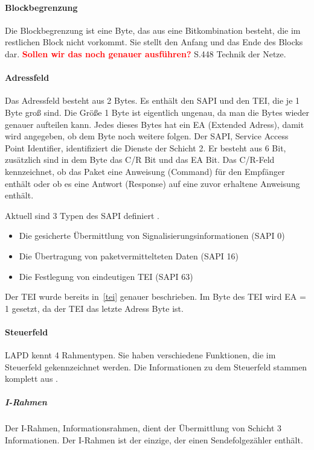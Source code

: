 \documentclass[12pt, a4paper, ngerman]{article}
\begin{document}
\paragraph{Blockbegrenzung \label{blockbegrenzung}}
Die Blockbegrenzung ist eine Byte, das aus eine Bitkombination besteht, die im restlichen Block nicht vorkommt. Sie stellt den Anfang und das Ende des Blocks dar. \textcolor{red}{\textbf{Sollen wir das noch genauer ausführen?}}  S.448 Technik der Netze.  

\paragraph{Adressfeld}
Das Adressfeld besteht aus 2 Bytes. Es enthält den SAPI und den TEI, die je 1 Byte groß sind. Die Größe 1 Byte ist eigentlich ungenau, da man die Bytes wieder genauer aufteilen kann. Jedes dieses Bytes hat ein EA (Extended Adress), damit wird angegeben, ob dem Byte noch weitere folgen. Der SAPI, Service Access Point Identifier,  identifiziert die Dienste der Schicht 2. Er besteht aus 6 Bit, zusätzlich sind in dem Byte das C/R Bit und das EA Bit. Das C/R-Feld kennzeichnet, ob das Paket eine Anweisung (Command) für den Empfänger enthält oder ob es eine Antwort (Response) auf eine zuvor erhaltene Anweisung enthält. 

Aktuell sind 3 Typen des SAPI definiert \cite{SWB-098672061}. 
\begin{itemize}
	\item Die gesicherte Übermittlung von Signalisierungsinformationen (SAPI 0)
	\item Die Übertragung von paketvermittelteten Daten (SAPI 16)
	\item Die Festlegung von eindeutigen TEI (SAPI 63)
\end{itemize}



Der TEI wurde bereits in~\ref{tei} genauer beschrieben. Im Byte des TEI wird EA = 1 gesetzt, da der TEI das letzte Adress Byte ist.

\paragraph{Steuerfeld}
LAPD kennt 4 Rahmentypen. Sie haben verschiedene Funktionen, die im Steuerfeld gekennzeichnet werden. Die Informationen zu dem Steuerfeld stammen komplett aus \cite{SWB-098672061}.

\subparagraph{I-Rahmen}
Der I-Rahmen, Informationsrahmen, dient der Übermittlung von Schicht 3 Informationen. Der I-Rahmen ist der einzige, der einen Sendefolgezähler enthält.
\end{document}
